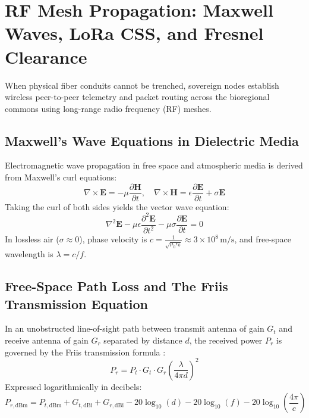 \section{RF Mesh Propagation: Maxwell Waves, LoRa CSS, and Fresnel Clearance}
\label{sec:em_rf_mesh}

When physical fiber conduits cannot be trenched, sovereign nodes establish wireless peer-to-peer telemetry and packet routing across the bioregional commons using long-range radio frequency (RF) meshes.

\subsection{Maxwell's Wave Equations in Dielectric Media}
Electromagnetic wave propagation in free space and atmospheric media is derived from Maxwell's curl equations:
\begin{equation}
\nabla \times \mathbf{E} = -\mu \frac{\partial \mathbf{H}}{\partial t}, \quad \nabla \times \mathbf{H} = \epsilon \frac{\partial \mathbf{E}}{\partial t} + \sigma \mathbf{E}
\label{eq:maxwell_curl}
\end{equation}
Taking the curl of both sides yields the vector wave equation:
\begin{equation}
\nabla^2 \mathbf{E} - \mu \epsilon \frac{\partial^2 \mathbf{E}}{\partial t^2} - \mu \sigma \frac{\partial \mathbf{E}}{\partial t} = 0
\label{eq:electromagnetic_wave_eq}
\end{equation}
In lossless air ($\sigma \approx 0$), phase velocity is $c = \frac{1}{\sqrt{\mu_0 \epsilon_0}} \approx 3 \times 10^8\,\mathrm{m/s}$, and free-space wavelength is $\lambda = c / f$.

\subsection{Free-Space Path Loss and The Friis Transmission Equation}
In an unobstructed line-of-sight path between transmit antenna of gain $G_t$ and receive antenna of gain $G_r$ separated by distance $d$, the received power $P_r$ is governed by the Friis transmission formula \cite{balanis2015antenna}:
\begin{equation}
P_r = P_t \cdot G_t \cdot G_r \left( \frac{\lambda}{4 \pi d} \right)^2
\label{eq:friis_formula}
\end{equation}
Expressed logarithmically in decibels:
\begin{equation}
P_{r,\mathrm{dBm}} = P_{t,\mathrm{dBm}} + G_{t,\mathrm{dBi}} + G_{r,\mathrm{dBi}} - 20\log_{10}(d) - 20\log_{10}(f) - 20\log_{10}\left(\frac{4\pi}{c}\right)
\label{eq:friis_db}
\end{equation}

